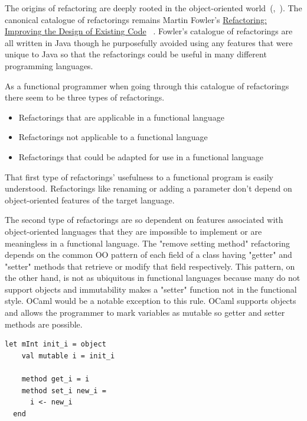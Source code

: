 The origins of refactoring are deeply rooted in the object-oriented world~(\cite{programRestructuring},~\cite{refactOOFrameworks}). The canonical catalogue of refactorings remains Martin Fowler's \underline{Refactoring: Improving the Design of Existing Code} ~\citep{fowler}. Fowler's catalogue of refactorings are all written in Java though he purposefully avoided using any features that were unique to Java so that the refactorings could be useful in many different programming languages.

As a functional programmer when going through this catalogue of refactorings there seem to be three types of refactorings.

\begin{itemize}
	\item Refactorings that are applicable in a functional language
	\item Refactorings not applicable to a functional language
	\item Refactorings that could be adapted for use in a functional language
\end{itemize}

That first type of refactorings' usefulness to a functional program is easily understood. Refactorings like renaming or adding a parameter don't depend on object-oriented features of the target language. 

The second type of refactorings are so dependent on features associated with object-oriented languages that they are impossible to implement or are meaningless in a functional language. The "remove setting method" refactoring depends on the common OO pattern of each field of a class having "getter" and "setter" methods that retrieve or modify that field respectively. This pattern, on the other hand, is not as ubiquitous in functional languages because many do not support objects and immutability makes a "setter" function not in the functional style. OCaml would be a notable exception to this rule. OCaml supports objects and allows the programmer to mark variables as mutable so getter and setter methods are possible.

\begin{lstlisting}[caption={An OCaml object with getter and setter methods.},captionpos=b, language=caml, morekeywords={object,method},label=ocamlObj]
let mInt init_i = object
    val mutable i = init_i

    method get_i = i
    method set_i new_i =
      i <- new_i
  end
\end{lstlisting}


